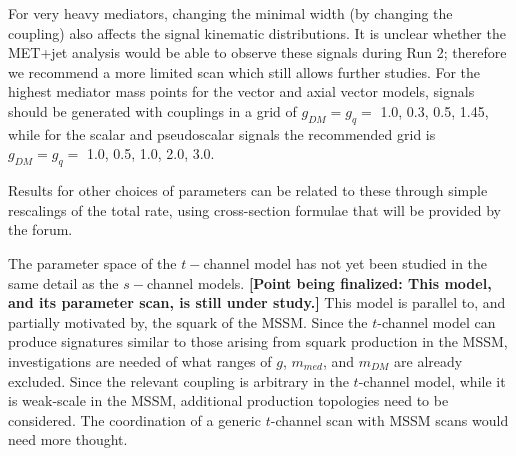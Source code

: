 \documentclass[a4,debug,notitlepage,nobib]{tufte-handout}
\newcommand{\mdm}{\ensuremath{m_{DM}}\xspace}
\newcommand{\mmed}{\ensuremath{m_{med}}\xspace}
\newcommand{\gq}{\ensuremath{g_{q}}\xspace}
\begin{document}
For very heavy mediators, changing
the minimal width (by changing the coupling) also affects the signal
kinematic distributions. It is unclear whether the MET+jet analysis
would be able to observe these signals during Run 2; therefore we
recommend a more limited scan which still allows further studies.
For the highest mediator mass points for the vector and axial vector models, 
signals should be generated with couplings in a grid of $g_{DM} = g_{q} = $ 1.0, 0.3, 0.5, 1.45,
while for the scalar and pseudoscalar signals the recommended grid is
$g_{DM} = g_{q} = $ 1.0, 0.5, 1.0, 2.0, 3.0.




Results for other choices of parameters can be related to
these through simple rescalings of the total rate, using cross-section
formulae that will be provided by the forum.

The parameter space of the $t-$channel model 
has not yet been studied in the same detail as the
$s-$channel models. 
\textbf{[Point being finalized: This model, and its parameter scan, is still 
under study.]}
This model is parallel to, and partially motivated by, the
squark of the MSSM. Since the $t$-channel model can produce signatures 
similar to those arising from squark production in the MSSM, investigations 
are needed of what ranges of $g$, \mmed, and \mdm are already excluded.
Since the relevant coupling is arbitrary in the $t$-channel model, while
it is weak-scale in the MSSM, additional production topologies need to
be considered. The coordination of a generic $t$-channel scan with
MSSM scans would need more thought.
\end{document}
